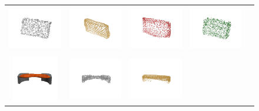 \documentclass[bachelor, nocolorlinks, printoneside]{seuthesis} %
\begin{document}
\begin{Main}
\begin{figure}[!h]
\begin{tabular}{c@{}c@{}c@{}c@{}c@{}}
    	\includegraphics[width=0.22\columnwidth,height=2cm]{figs/real_dataset/GT/bag_8569a0c606bbba73d9985ad45fbb635e.png} &
    	\includegraphics[width=0.22\columnwidth,height=2cm]{figs/real_dataset/AE_label/bag_8569a0c606bbba73d9985ad45fbb635e_fine.png} &
    	\includegraphics[width=0.22\columnwidth,height=2cm]{figs/real_dataset/AE/bag_8569a0c606bbba73d9985ad45fbb635e.png} &
    	\includegraphics[width=0.22\columnwidth,height=2cm]{figs/real_dataset/oracle/bag_8569a0c606bbba73d9985ad45fbb635e.png} \\  
    	\vspace{-5mm}
    	\includegraphics[width=0.11\columnwidth,height=2cm]{figs/real_dataset/Image/bench_17ebf60b6ba61ae949e6f7df978f3373.png} &
    	\includegraphics[width=0.22\columnwidth,height=2cm]{figs/real_dataset/GT/bench_17ebf60b6ba61ae949e6f7df978f3373_gt.png} &
    	\includegraphics[width=0.22\columnwidth,height=2cm]{figs/real_dataset/AE_label/bench_17ebf60b6ba61ae949e6f7df978f3373_fine.png} &

\end{tabular}
\end{figure}
\end{Main}
\end{document}
